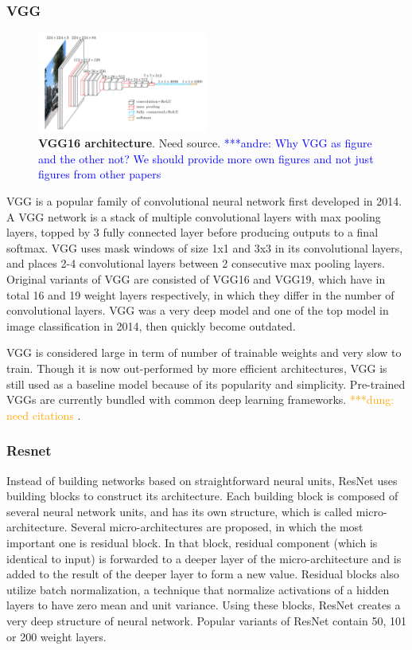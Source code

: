 \documentclass[conference]{IEEEtran}
\newcommand{\alnote}[1]{ {\textcolor{blue} { ***andre: #1 }}}
\newcommand{\dungnote}[1]{ {\textcolor{orange} { ***dung: #1 }}}
\newcommand{\alnote}[1]{}
\newcommand{\dungnote}[1]{}
\begin{document}
\subsubsection{VGG}

\begin{figure}[htpb]
	  \centering
	  \includegraphics[width=0.5\textwidth]{vgg16}
	  \caption{\textbf{VGG16 architecture}. Need source. \alnote{Why VGG as figure and the other not? We should provide more own figures and not just figures from other papers}
	  \label{fig:vgg16}}
\end{figure}
VGG is a popular family of convolutional neural network first developed in 2014. A VGG network is a stack of multiple convolutional layers with max pooling layers, topped by 3 fully connected layer before producing outputs to a final softmax. VGG uses mask windows of size 1x1 and 3x3 in its convolutional layers, and places 2-4 convolutional layers between 2 consecutive max pooling layers. Original variants of VGG are consisted of VGG16 and VGG19, which have in total 16 and 19 weight layers respectively, in which they differ in the number of convolutional layers. VGG was a very deep model and one of the top model in image classification in 2014, then quickly become outdated.

VGG is considered large in term of number of trainable weights and very slow to train. Though it is now out-performed by more efficient architectures, VGG is still used as a baseline model because of its popularity and simplicity. Pre-trained VGGs are currently bundled with common deep learning frameworks. \dungnote{need citations}.

\subsubsection{Resnet}
Instead of building networks based on straightforward neural units, ResNet uses building blocks to construct its architecture. Each building block is composed of several neural network units, and has its own structure, which is called micro-architecture. Several micro-architectures are proposed, in which the most important one is residual block. In that block, residual component (which is identical to input) is forwarded to a deeper layer of the micro-architecture and is added to the result of the deeper layer to form a new value. Residual blocks also utilize batch normalization, a technique that normalize activations of a hidden layers to have zero mean and unit variance. Using these blocks, ResNet creates a very deep structure of neural network. Popular variants of ResNet contain 50, 101 or 200 weight layers.
\end{document}

